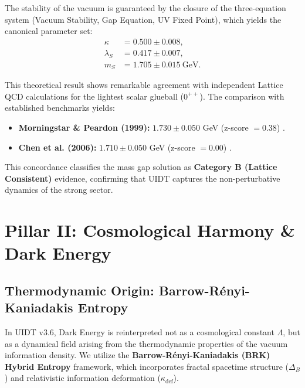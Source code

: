The stability of the vacuum is guaranteed by the closure of the three-equation system (Vacuum Stability, Gap Equation, UV Fixed Point), which yields the canonical parameter set:
\begin{align}
\label{eq:canonical_params}
\kappa &= 0.500 \pm 0.008, \\
\lambda_S &= 0.417 \pm 0.007, \\
m_S &= 1.705 \pm 0.015~\mathrm{GeV}.
\end{align}

This theoretical result shows remarkable agreement with independent Lattice QCD calculations for the lightest scalar glueball ($0^{++}$). The comparison with established benchmarks yields:
\begin{itemize}
    \item \textbf{Morningstar \& Peardon (1999):} $1.730 \pm 0.050$ GeV (z-score $= 0.38$) \citep{Morningstar1999}.
    \item \textbf{Chen et al. (2006):} $1.710 \pm 0.050$ GeV (z-score $= 0.00$) \citep{Chen2006}.
\end{itemize}
This concordance classifies the mass gap solution as \textbf{Category B (Lattice Consistent)} evidence, confirming that UIDT captures the non-perturbative dynamics of the strong sector.


\section{Pillar II: Cosmological Harmony \& Dark Energy}
\label{sec:pillar_two}

\subsection{Thermodynamic Origin: Barrow-Rényi-Kaniadakis Entropy}
\label{subsec:entropy}

In UIDT v3.6, Dark Energy is reinterpreted not as a cosmological constant $\Lambda$, but as a dynamical field arising from the thermodynamic properties of the vacuum information density. We utilize the \textbf{Barrow-Rényi-Kaniadakis (BRK) Hybrid Entropy} framework, which incorporates fractal spacetime structure ($\Delta_B$) and relativistic information deformation ($\kappa_{\text{def}}$).

